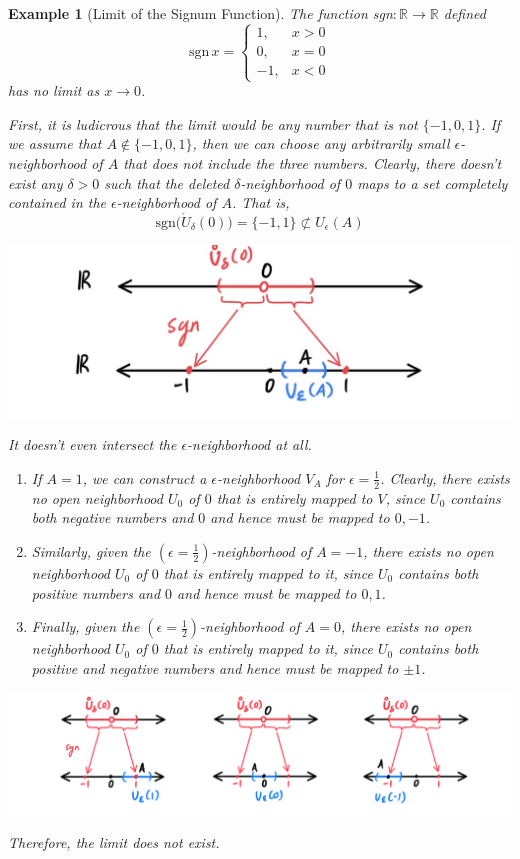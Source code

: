 \documentclass{article}
\newtheorem{example}{Example}[section]
\theoremstyle{remark}
\theoremstyle{definition}
\begin{document}
\begin{example}[Limit of the Signum Function]
The function sgn$: \mathbb{R} \longrightarrow \mathbb{R}$ defined
\[\text{sgn}\,x = \begin{cases}
1, & x > 0 \\
0, & x = 0 \\
-1, & x < 0
\end{cases}\]
has no limit as $x \rightarrow 0$. 

First, it is ludicrous that the limit would be any number that is not $\{-1, 0, 1\}$. If we assume that $A \not\in \{-1,0,1\}$, then we can choose any arbitrarily small $\epsilon$-neighborhood of $A$ that does not include the three numbers. Clearly, there doesn't exist any $\delta>0$ such that the deleted $\delta$-neighborhood of $0$ maps to a set completely contained in the $\epsilon$-neighborhood of $A$. That is,
\[\text{sgn}\big( \mathring{U}_\delta (0)\big) = \{-1,1\} \not\subset U_\epsilon (A)\]
\begin{center}
    \includegraphics[scale=0.3]{img/Limit_of_Sign_Function_Ludicrous.PNG}
\end{center}
It doesn't even intersect the $\epsilon$-neighborhood at all. 
\begin{enumerate}
    \item If $A = 1$, we can construct a $\epsilon$-neighborhood $V_A$ for $\epsilon = \frac{1}{2}$. Clearly, there exists no open neighborhood $U_0$ of $0$ that is entirely mapped to $V$, since $U_0$ contains both negative numbers and $0$ and hence must be mapped to $0, -1$. 
    \item Similarly, given the $(\epsilon=\frac{1}{2})$-neighborhood of $A = -1$, there exists no open neighborhood $U_0$ of $0$ that is entirely mapped to it, since $U_0$ contains both positive numbers and $0$ and hence must be mapped to $0, 1$. 
    \item Finally, given the $(\epsilon=\frac{1}{2})$-neighborhood of $A = 0$, there exists no open neighborhood $U_0$ of $0$ that is entirely mapped to it, since $U_0$ contains both positive and negative numbers and hence must be mapped to $\pm1$. 
\end{enumerate}
\begin{center}
    \includegraphics[scale=0.3]{img/Limit_of_Sign_Function_1_0_-1.PNG}
\end{center}
Therefore, the limit does not exist. 
\end{example}
\end{document}
